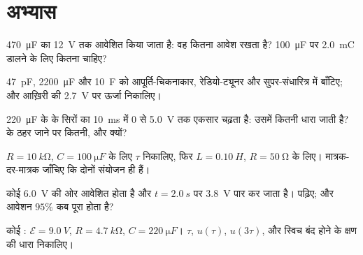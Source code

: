 \section{अभ्यास}

\begin{exercise}[$\star$]\label{exo:g12:rc-rl-circuits:1}
\qty{470}{\micro F} का  \qty{12}{V} तक आवेशित किया जाता है: वह कितना आवेश
रखता है? \qty{100}{\micro F} पर \qty{2.0}{mC} डालने के लिए कितना  चाहिए?
\end{exercise}

\begin{exercise}[$\star$]\label{exo:g12:rc-rl-circuits:2}
\qty{47}{pF}, \qty{2200}{\micro F} और \qty{10}{F} को आपूर्ति-चिकनाकार, रेडियो-ट्यूनर और
सुपर-संधारित्र में बाँटिए; और आख़िरी की \qty{2.7}{V} पर ऊर्जा निकालिए।
\end{exercise}

\begin{exercise}[$\star$]\label{exo:g12:rc-rl-circuits:3}
\qty{220}{\micro F} के  के सिरों का  \qty{10}{ms} में
$0$ से \qty{5.0}{V} तक एकसार चढ़ता है: उसमें कितनी धारा जाती है?
 के ठहर जाने पर कितनी, और क्यों?
\end{exercise}

\begin{exercise}[$\star$]\label{exo:g12:rc-rl-circuits:4}
$R = \qty{10}{k\ohm}$, $C = \qty{100}{\micro F}$ के लिए $\tau$ निकालिए, फिर $L = \qty{0.10}{H}$, $R = \qty{50}{\ohm}$ के लिए।
मात्रक-दर-मात्रक जाँचिए कि दोनों संयोजन  ही हैं।
\end{exercise}

\begin{exercise}[$\star$]\label{exo:g12:rc-rl-circuits:5}
कोई  \qty{6.0}{V} की ओर आवेशित होता है और $t = \qty{2.0}{s}$ पर \qty{3.8}{V} पार
कर जाता है।  पढ़िए; और आवेशन $95\%$ कब पूरा होता है?
\end{exercise}

\begin{exercise}[$\star\star$]\label{exo:g12:rc-rl-circuits:6}
कोई : $\mathcal{E} = \qty{9.0}{V}$, $R = \qty{4.7}{k\ohm}$, $C = \qty{220}{\micro F}$। $\tau$, $u(\tau)$, $u(3\tau)$,
और स्विच बंद होने के क्षण की धारा निकालिए।
\end{exercise}

